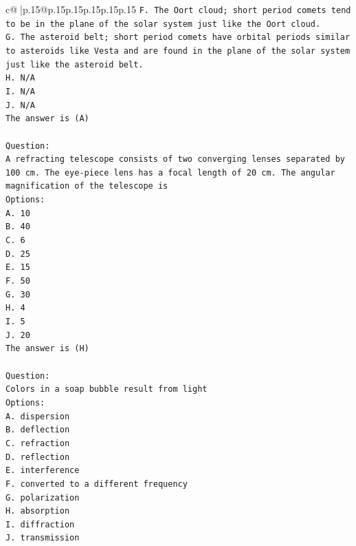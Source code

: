 \documentclass{article}
\begin{document}
{\begin{supertabular}{c@{$\;$}|p{.15\linewidth}@{}p{.15\linewidth}p{.15\linewidth}p{.15\linewidth}p{.15\linewidth}p{.15\linewidth}}
{{{\texttt{F. The Oort cloud; short period comets tend to be in the plane of the solar system just like the Oort cloud.} \\
\texttt{G. The asteroid belt; short period comets have orbital periods similar to asteroids like Vesta and are found in the plane of the solar system just like the asteroid belt.} \\
\texttt{H. N/A} \\
\texttt{I. N/A} \\
\texttt{J. N/A} \\
\texttt{The answer is (A)} \\
\\ 
\texttt{Question:} \\
\texttt{A refracting telescope consists of two converging lenses separated by 100 cm. The eye{-}piece lens has a focal length of 20 cm. The angular magnification of the telescope is} \\
\texttt{Options:} \\
\texttt{A. 10} \\
\texttt{B. 40} \\
\texttt{C. 6} \\
\texttt{D. 25} \\
\texttt{E. 15} \\
\texttt{F. 50} \\
\texttt{G. 30} \\
\texttt{H. 4} \\
\texttt{I. 5} \\
\texttt{J. 20} \\
\texttt{The answer is (H)} \\
\\ 
\texttt{Question:} \\
\texttt{Colors in a soap bubble result from light} \\
\texttt{Options:} \\
\texttt{A. dispersion} \\
\texttt{B. deflection} \\
\texttt{C. refraction} \\
\texttt{D. reflection} \\
\texttt{E. interference} \\
\texttt{F. converted to a different frequency} \\
\texttt{G. polarization} \\
\texttt{H. absorption} \\
\texttt{I. diffraction} \\
\texttt{J. transmission} \\
}}}
\end{supertabular}}
\end{document}
